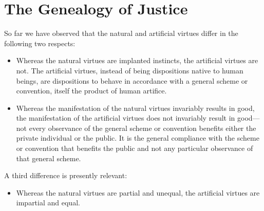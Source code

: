 
\section{The Genealogy of Justice}\label{sec:the_genealogy_of_justice} %

So far we have observed that the natural and artificial virtues differ in the following two respects:

\begin{itemize}
    \item Whereas the natural virtues are implanted instincts, the artificial virtues are not. The artificial virtues, instead of being dispositions native to human beings, are dispositions to behave in accordance with a general scheme or convention, itself the product of human artifice.
    \item Whereas the manifestation of the natural virtues invariably results in good, the manifestation of the artificial virtues does not invariably result in good---not every observance of the general scheme or convention benefits either the private individual or the public. It is the general compliance with the scheme or convention that benefits the public and not any particular observance of that general scheme.
\end{itemize}

A third difference is presently relevant:

\begin{itemize}
    \item Whereas the natural virtues are partial and unequal, the artificial virtues are impartial and equal.
\end{itemize}

% 

